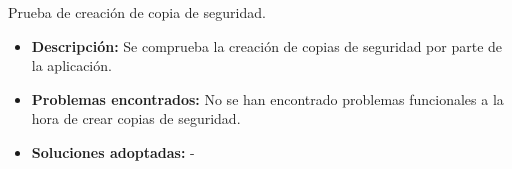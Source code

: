 \item Prueba de creación de copia de seguridad.
  \begin{itemize}
    \item \textbf{Descripción:} Se comprueba la creación de copias de seguridad
    por parte de la aplicación.
    \item \textbf{Problemas encontrados:} No se han encontrado problemas
    funcionales a la hora de crear copias de seguridad.
    \item \textbf{Soluciones adoptadas:} -
  \end{itemize}
